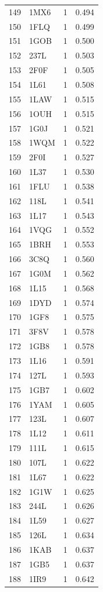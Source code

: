 \begin{longtable}{r l r r}
149 & 1MX6 & 1 & 0.494 \\
150 & 1FLQ & 1 & 0.499 \\
151 & 1GOB & 1 & 0.500 \\
152 & 237L & 1 & 0.503 \\
153 & 2F0F & 1 & 0.505 \\
154 & 1L61 & 1 & 0.508 \\
155 & 1LAW & 1 & 0.515 \\
156 & 1OUH & 1 & 0.515 \\
157 & 1G0J & 1 & 0.521 \\
158 & 1WQM & 1 & 0.522 \\
159 & 2F0I & 1 & 0.527 \\
160 & 1L37 & 1 & 0.530 \\
161 & 1FLU & 1 & 0.538 \\
162 & 118L & 1 & 0.541 \\
163 & 1L17 & 1 & 0.543 \\
164 & 1VQG & 1 & 0.552 \\
165 & 1BRH & 1 & 0.553 \\
166 & 3C8Q & 1 & 0.560 \\
167 & 1G0M & 1 & 0.562 \\
168 & 1L15 & 1 & 0.568 \\
169 & 1DYD & 1 & 0.574 \\
170 & 1GF8 & 1 & 0.575 \\
171 & 3F8V & 1 & 0.578 \\
172 & 1GB8 & 1 & 0.578 \\
173 & 1L16 & 1 & 0.591 \\
174 & 127L & 1 & 0.593 \\
175 & 1GB7 & 1 & 0.602 \\
176 & 1YAM & 1 & 0.605 \\
177 & 123L & 1 & 0.607 \\
178 & 1L12 & 1 & 0.611 \\
179 & 111L & 1 & 0.615 \\
180 & 107L & 1 & 0.622 \\
181 & 1L67 & 1 & 0.622 \\
182 & 1G1W & 1 & 0.625 \\
183 & 244L & 1 & 0.626 \\
184 & 1L59 & 1 & 0.627 \\
185 & 126L & 1 & 0.634 \\
186 & 1KAB & 1 & 0.637 \\
187 & 1GB5 & 1 & 0.637 \\
188 & 1IR9 & 1 & 0.642 \\

\end{longtable}
